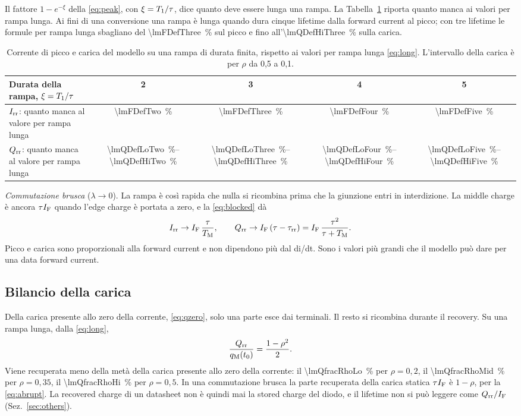 \documentclass[10pt,a4paper]{scrartcl}
\let\newcommand\pdvaluedefine
\newcommand{\IF}{I_\mathrm{F}}
\newcommand{\Irr}{I_\mathrm{rr}}
\newcommand{\Qrr}{Q_\mathrm{rr}}
\newcommand{\taurr}{\tau_\mathrm{rr}}
\newcommand{\TM}{T_\mathrm{M}}
\newcommand{\Tone}{T_1}
\newcommand{\qM}{q_\mathrm{M}}
\begin{document}
Il fattore $1 - e^{-\xi}$ della \eqref{eq:peak}, con $\xi = \Tone/\tau$, dice quanto deve essere lunga una rampa. La Tabella~\ref{tab:long} riporta quanto manca ai valori per rampa lunga. Ai fini di una conversione una rampa è lunga quando dura cinque lifetime dalla forward current al picco; con tre lifetime le formule per rampa lunga sbagliano del \SI{\lmFDefThree}{\percent} sul picco e fino all'\SI{\lmQDefHiThree}{\percent} sulla carica.

\begin{table}[htb]
\centering\small
\caption{Corrente di picco e carica del modello su una rampa di durata finita, rispetto ai valori per rampa lunga \eqref{eq:long}. L'intervallo della carica è per $\rho$ da 0,5 a 0,1.}
\label{tab:long}
\begin{tabular}{@{}lcccc@{}}
\toprule
Durata della rampa, $\xi = \Tone/\tau$ & 2 & 3 & 4 & 5 \\
\midrule
$\Irr$: quanto manca al valore per rampa lunga & \SI{\lmFDefTwo}{\percent} & \SI{\lmFDefThree}{\percent} & \SI{\lmFDefFour}{\percent} & \SI{\lmFDefFive}{\percent} \\
$\Qrr$: quanto manca al valore per rampa lunga & \SIrange{\lmQDefLoTwo}{\lmQDefHiTwo}{\percent} & \SIrange{\lmQDefLoThree}{\lmQDefHiThree}{\percent} & \SIrange{\lmQDefLoFour}{\lmQDefHiFour}{\percent} & \SIrange{\lmQDefLoFive}{\lmQDefHiFive}{\percent} \\
\bottomrule
\end{tabular}
\end{table}

\emph{Commutazione brusca} ($\lambda \to 0$). La rampa è così rapida che nulla si ricombina prima che la giunzione entri in interdizione. La middle charge è ancora $\tau\IF$ quando l'edge charge è portata a zero, e la \eqref{eq:blocked} dà
\begin{equation}
\Irr \to \IF\,\frac{\tau}{\TM} , \qquad \Qrr \to \IF\,(\tau - \taurr) = \IF\,\frac{\tau^2}{\tau+\TM} .
\label{eq:abrupt}
\end{equation}
Picco e carica sono proporzionali alla forward current e non dipendono più dal di/dt. Sono i valori più grandi che il modello può dare per una data forward current.

\subsection{Bilancio della carica}
Della carica presente allo zero della corrente, \eqref{eq:qzero}, solo una parte esce dai terminali. Il resto si ricombina durante il recovery. Su una rampa lunga, dalla \eqref{eq:long},
\begin{equation}
\frac{\Qrr}{\qM(t_0)} = \frac{1-\rho^2}{2} .
\label{eq:fraction}
\end{equation}
Viene recuperata meno della metà della carica presente allo zero della corrente: il \SI{\lmQfracRhoLo}{\percent} per $\rho = 0,2$, il \SI{\lmQfracRhoMid}{\percent} per $\rho = 0,35$, il \SI{\lmQfracRhoHi}{\percent} per $\rho = 0,5$. In una commutazione brusca la parte recuperata della carica statica $\tau\IF$ è $1-\rho$, per la \eqref{eq:abrupt}. La recovered charge di un datasheet non è quindi mai la stored charge del diodo, e il lifetime non si può leggere come $\Qrr/\IF$ (Sez.~\ref{sec:others}).
\end{document}
